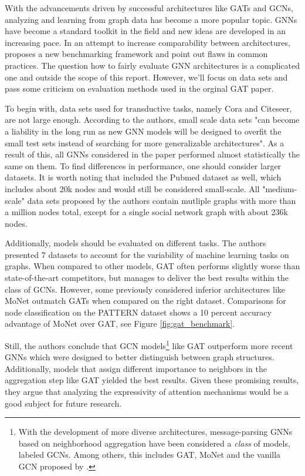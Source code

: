 \label{chapter:related_work}

With the advancements driven by successful architectures like GATs and GCNs, analyzing and learning from graph data has become a more popular topic. GNNs have become a standard toolkit in the field and new ideas are developed in an increasing pace. In an attempt to increase comparability between architectures, \cite{dwivedi2020benchmarking} proposes a new benchmarking framework and point out flaws in common practices. The question how to fairly evaluate GNN architectures is a complicated one and outside the scope of this report. However, we'll focus on data sets and pass some criticism on evaluation methods used in the orginal GAT paper.

To begin with, data sets used for transductive tasks, namely Cora and Citeseer, are not large enough. According to the authors, small scale data sets "can become a liability in the long run as new GNN models will be designed to overfit the small test sets instead of searching for more generalizable architectures". As a result of this, all GNNs considered in the paper performed almost statistically the same on them. To find differences in performance, one should consider larger datasets. It is worth noting that \cite{velickovic2018graph} included the Pubmed dataset as well, which includes about 20k nodes and would still be considered small-scale. All "medium-scale" data sets proposed by the authors contain mutliple graphs with more than a million nodes total, except for a single social network graph with about 236k nodes.

Additionally, models should be evaluated on different tasks.  The authors presented 7 datasets to account for the variability of machine learning tasks on graphs. When compared to other models, GAT often performs slightly worse than state-of-the-art competitors, but manages to deliver the best results within the class of GCNs. However, some previously considered inferior architectures like MoNet outmatch GATs when compared on the right dataset. Comparisons for node classification on the PATTERN dataset shows a 10 percent accuracy advantage of MoNet over GAT, see Figure \ref{fig:gat_benchmark}.


Still, the authors conclude that GCN models\footnote{With the development of more diverse architectures, message-parsing GNNs based on neighborhood aggregation have been considered a \textit{class} of models, labeled GCNs. Among others, this includes GAT, MoNet and the vanilla GCN proposed by \cite{kipf2017semisupervised}.} like GAT outperform more recent GNNs which were designed to better distinguish between graph structures. Additionally, models that assign different importance to neighbors in the aggregation step like GAT yielded the best results. Given these promising results, they argue that analyzing the expressivity of attention mechanisms would be a good subject for future research.

